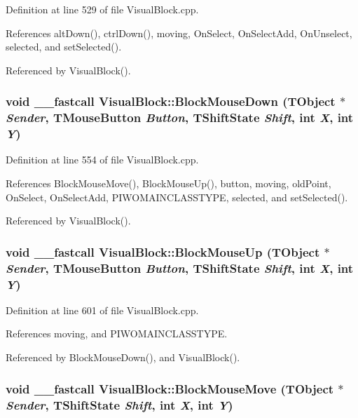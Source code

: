 Definition at line 529 of file VisualBlock.cpp.

References altDown(), ctrlDown(), moving, OnSelect, OnSelectAdd, OnUnselect, selected, and setSelected().

Referenced by VisualBlock().\hypertarget{classVisualBlock_4105b606e41f9682f565a982e5ba78ac}{
\subsubsection[BlockMouseDown]{\setlength{\rightskip}{0pt plus 5cm}void \_\-\_\-fastcall VisualBlock::BlockMouseDown (TObject $\ast$ {\em Sender}, \/  TMouseButton {\em Button}, \/  TShiftState {\em Shift}, \/  int {\em X}, \/  int {\em Y})}}
\label{classVisualBlock_4105b606e41f9682f565a982e5ba78ac}




Definition at line 554 of file VisualBlock.cpp.

References BlockMouseMove(), BlockMouseUp(), button, moving, oldPoint, OnSelect, OnSelectAdd, PIWOMAINCLASSTYPE, selected, and setSelected().

Referenced by VisualBlock().\hypertarget{classVisualBlock_e4aaf7841bf53a143a3c83df422dc387}{
\subsubsection[BlockMouseUp]{\setlength{\rightskip}{0pt plus 5cm}void \_\-\_\-fastcall VisualBlock::BlockMouseUp (TObject $\ast$ {\em Sender}, \/  TMouseButton {\em Button}, \/  TShiftState {\em Shift}, \/  int {\em X}, \/  int {\em Y})}}
\label{classVisualBlock_e4aaf7841bf53a143a3c83df422dc387}




Definition at line 601 of file VisualBlock.cpp.

References moving, and PIWOMAINCLASSTYPE.

Referenced by BlockMouseDown(), and VisualBlock().\hypertarget{classVisualBlock_f88b17e4ee367aa1bd52e0ba403e3ec9}{
\subsubsection[BlockMouseMove]{\setlength{\rightskip}{0pt plus 5cm}void \_\-\_\-fastcall VisualBlock::BlockMouseMove (TObject $\ast$ {\em Sender}, \/  TShiftState {\em Shift}, \/  int {\em X}, \/  int {\em Y})}}
\label{classVisualBlock_f88b17e4ee367aa1bd52e0ba403e3ec9}




